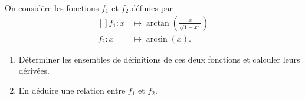 
\begin{exercice}\label{exomazhe-0006}

	On considère les fonctions $f_1$ et $f_2$ définies par
	\begin{equation}
		\begin{aligned}[]
			f_1\colon x&\mapsto \arctan\left(\frac{ x }{ \sqrt{1-x^2} }\right)\\
			f_2\colon x&\mapsto \arcsin(x).
		\end{aligned}
	\end{equation}
	\begin{enumerate}
		\item
			Déterminer les ensembles de définitions de ces deux fonctions et calculer leurs dérivées.
		\item
			En déduire une relation entre $f_1$ et $f_2$.
	\end{enumerate}

\end{exercice}
